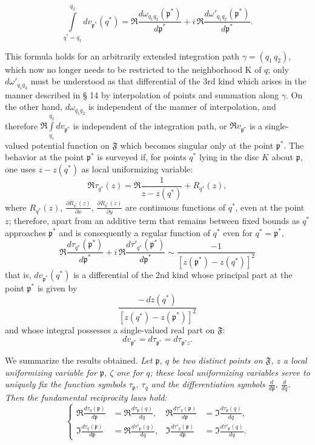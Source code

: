 \documentclass{article}
\begin{document}
\[ \int\limits_{q^* = q_1}^{q_2} dv_{\mathfrak{p}^*}(q^*) = \Re \frac{d\omega_{q_1 q_2}(\mathfrak{p}^*)}{d\mathfrak{p}^*} + i\,\Re \frac{d\omega'_{q_1 q_2}(\mathfrak{p}^*)}{d\mathfrak{p}^*}. \]

This formula holds for an arbitrarily extended integration path $\gamma = (q_1\,q_2)$, which now no longer needs to be restricted to the neighborhood $\mathrm{K}$ of $q$; only $d\omega'_{q_1 q_2}$ must be understood as that differential of the 3rd kind which arises in the manner described in § 14 by interpolation of points and summation along $\gamma$. On the other hand, $d\omega_{q_1 q_2}$ is independent of the manner of interpolation, and therefore $\Re \displaystyle\int\limits_{q_1}^{q_2} dv_{\mathfrak{p}^*}$ is independent of the integration path, or $\Re v_{\mathfrak{p}^*}$ is a single-valued potential function on $\mathfrak{F}$ which becomes singular only at the point $\mathfrak{p}^*$. The behavior at the point $\mathfrak{p}^*$ is surveyed if, for points $q^*$ lying in the disc $K$ about $\mathfrak{p}$, one uses $z - z(q^*)$ as local uniformizing variable:
\[ \Re\tau_{q^*}(z) = \Re \frac{1}{z - z(q^*)} + R_{q^*}(z), \]
where $R_{q^*}(z)$, $\frac{\partial R_{q^*}(z)}{\partial x}$, $\frac{\partial R_{q^*}(z)}{\partial y}$ are continuous functions of $q^*$, even at the point $z$; therefore, apart from an additive term that remains between fixed bounds as $q^*$ approaches $\mathfrak{p}^*$ and is consequently a regular function of $q^*$ even for $q^* = \mathfrak{p}^*$,
\[ \Re \frac{d\tau_{q^*}(\mathfrak{p}^*)}{d\mathfrak{p}^*} + i\,\Re \frac{d\tau'_{q^*}(\mathfrak{p}^*)}{d\mathfrak{p}^*} \sim \frac{-1}{[z(\mathfrak{p}^*) - z(q^*)]^2} \]
that is, $dv_{\mathfrak{p}^*}(q^*)$ is a differential of the 2nd kind whose principal part at the point $\mathfrak{p}^*$ is given by
\[ \frac{-\,dz(q^*)}{[z(q^*) - z(\mathfrak{p}^*)]^2} \]
and whose integral possesses a single-valued real part on $\mathfrak{F}$:
\[ dv_{\mathfrak{p}^*} = d\tau_{\mathfrak{p}^*} = d\tau_{\mathfrak{p}^* z}. \]

We summarize the results obtained. \emph{Let $\mathfrak{p}$, $q$ be two distinct points on $\mathfrak{F}$, $z$ a local uniformizing variable for $\mathfrak{p}$, $\zeta$ one for $q$; these local uniformizing variables serve to uniquely fix the function symbols $\tau_\mathfrak{p}$, $\tau_q$ and the differentiation symbols $\frac{d}{d\mathfrak{p}}$, $\frac{d}{dq}$. Then the fundamental reciprocity laws hold:}
\[ \left\{ \begin{aligned}
\Re \frac{d\tau_q(\mathfrak{p})}{d\mathfrak{p}} &= \Re \frac{d\tau_\mathfrak{p}(q)}{dq}, & \Re \frac{d\tau'_q(\mathfrak{p})}{d\mathfrak{p}} &= \Im \frac{d\tau_\mathfrak{p}(q)}{dq}, \\
\Im \frac{d\tau_q(\mathfrak{p})}{d\mathfrak{p}} &= \Re \frac{d\tau'_\mathfrak{p}(q)}{dq}, & \Im \frac{d\tau'_q(\mathfrak{p})}{d\mathfrak{p}} &= \Im \frac{d\tau'_\mathfrak{p}(q)}{dq}.
\end{aligned} \right. \tag{I} \]
\end{document}
